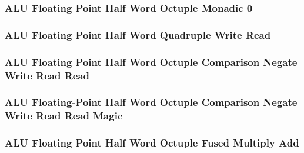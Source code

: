 

\subsubsection[{\small ALU Floating Point Half Word Octuple Monadic 0}]{ALU Floating Point Half Word Octuple Monadic 0} \label{sec:format-ALU-FHOMO0}



\subsubsection[{\small ALU Floating Point Half Word Quadruple Write Read}]{ALU Floating Point Half Word Quadruple Write Read} \label{sec:format-ALU-FHQWR}



\subsubsection[{\small ALU Floating Point Half Word Octuple Comparison Negate Write Read Read}]{ALU Floating Point Half Word Octuple Comparison Negate Write Read Read} \label{sec:format-ALU-FHOCNWRR}



\subsubsection[{\small ALU Floating-Point Half Word Octuple Comparison Negate Write Read Read Magic}]{ALU Floating-Point Half Word Octuple Comparison Negate Write Read Read Magic} \label{sec:format-ALU-FHOCNWRR.M}



\subsubsection[{\small ALU Floating Point Half Word Octuple Fused Multiply Add}]{ALU Floating Point Half Word Octuple Fused Multiply Add} \label{sec:format-ALU-FHOFMA}

